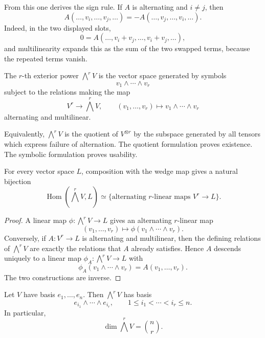 \documentclass[11pt]{memoir}
\newcommand{\Hom}{\operatorname{Hom}}
\begin{document}
From this one derives the sign rule. If \(A\) is alternating and
\(i\neq j\), then
\[
  A(\dots,v_i,\dots,v_j,\dots)
  =
  -A(\dots,v_j,\dots,v_i,\dots).
\]
Indeed, in the two displayed slots,
\[
  0=A(\dots,v_i+v_j,\dots,v_i+v_j,\dots),
\]
and multilinearity expands this as the sum of the two swapped terms,
because the repeated terms vanish.

\begin{definition}
\label{def:exterior-power}
The \(r\)-th exterior power \(\bigwedge^rV\) is the vector space
generated by symbols
\[
  v_1\wedge\cdots\wedge v_r
\]
subject to the relations making the map
\[
  V^r\to \bigwedge^rV,\qquad
  (v_1,\dots,v_r)\mapsto v_1\wedge\cdots\wedge v_r
\]
alternating and multilinear.
\end{definition}

Equivalently, \(\bigwedge^rV\) is the quotient of \(V^{\otimes r}\)
by the subspace generated by all tensors which express failure of
alternation. The quotient formulation proves existence. The symbolic
formulation proves usability.

\begin{proposition}
\label{prop:exterior-universal}
For every vector space \(L\), composition with the wedge map gives a
natural bijection
\[
  \Hom\left(\bigwedge^rV,L\right)
  \simeq
  \{\text{alternating \(r\)-linear maps }V^r\to L\}.
\]
\end{proposition}

\begin{proof}
A linear map \(\phi:\bigwedge^rV\to L\) gives an alternating
\(r\)-linear map
\[
  (v_1,\dots,v_r)\mapsto \phi(v_1\wedge\cdots\wedge v_r).
\]
Conversely, if \(A:V^r\to L\) is alternating and multilinear, then
the defining relations of \(\bigwedge^rV\) are exactly the relations
that \(A\) already satisfies. Hence \(A\) descends uniquely to a
linear map \(\phi_A:\bigwedge^rV\to L\) with
\[
  \phi_A(v_1\wedge\cdots\wedge v_r)=A(v_1,\dots,v_r).
\]
The two constructions are inverse.
\end{proof}

\begin{proposition}
\label{prop:wedge-basis}
Let \(V\) have basis \(e_1,\dots,e_n\). Then \(\bigwedge^rV\) has
basis
\[
  e_{i_1}\wedge\cdots\wedge e_{i_r},
  \qquad
  1\leq i_1<\cdots<i_r\leq n.
\]
In particular,
\[
  \dim\bigwedge^rV=\binom nr.
\]
\end{proposition}
\end{document}
